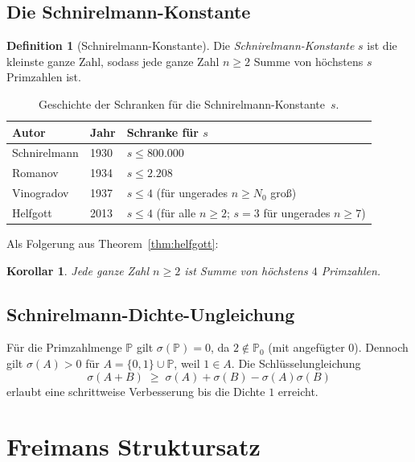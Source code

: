 \documentclass[12pt,a4paper]{amsart}
\newtheorem{korollar}[theorem]{Korollar}
\theoremstyle{definition}
\newtheorem{definition}[theorem]{Definition}
\begin{document}
\subsection{Die Schnirelmann-Konstante}

\begin{definition}[Schnirelmann-Konstante]
Die \emph{Schnirelmann-Konstante} $s$ ist die kleinste ganze Zahl, sodass
jede ganze Zahl $n \geq 2$ Summe von h\"{o}chstens $s$ Primzahlen ist.
\end{definition}

\begin{table}[h]
\centering
\begin{tabular}{@{}lll@{}}
\toprule
Autor & Jahr & Schranke f\"{u}r $s$ \\
\midrule
Schnirelmann & 1930 & $s \leq 800{.}000$ \\
Romanov      & 1934 & $s \leq 2{.}208$ \\
Vinogradov   & 1937 & $s \leq 4$ (f\"{u}r ungerades $n \geq N_0$ gro\ss{}) \\
Helfgott     & 2013 & $s \leq 4$ (f\"{u}r alle $n \geq 2$;
                              $s = 3$ f\"{u}r ungerades $n \geq 7$) \\
\bottomrule
\end{tabular}
\caption{Geschichte der Schranken f\"{u}r die Schnirelmann-Konstante~$s$.}
\label{tab:schnirelmann}
\end{table}

Als Folgerung aus Theorem~\ref{thm:helfgott}:
\begin{korollar}
Jede ganze Zahl $n \geq 2$ ist Summe von h\"{o}chstens $4$ Primzahlen.
\end{korollar}

\subsection{Schnirelmann-Dichte-Ungleichung}

F\"{u}r die Primzahlmenge $\mathbb{P}$ gilt $\sigma(\mathbb{P}) = 0$,
da $2 \notin \mathbb{P}_0$ (mit angef\"{u}gter 0).  Dennoch gilt
$\sigma(A) > 0$ f\"{u}r $A = \{0,1\} \cup \mathbb{P}$, weil $1 \in A$.
Die Schl\"{u}sselungleichung
\[
  \sigma(A + B) \;\geq\; \sigma(A) + \sigma(B) - \sigma(A)\sigma(B)
\]
erlaubt eine schrittweise Verbesserung bis die Dichte $1$ erreicht.

\section{Freimans Struktursatz}\label{sec:freiman}
\end{document}

